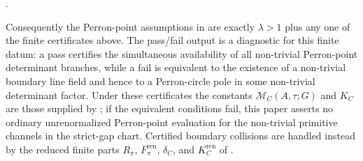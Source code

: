 \begin{proposition}
\begin{enumerate}[label=\rm(\roman*)]
    .
  \end{enumerate}
  Consequently the Perron-point assumptions in
   are
  exactly \(\lambda>1\) plus any one of the finite certificates above.
  The pass/fail output is a diagnostic for this finite datum: a pass certifies the simultaneous
  availability of all non-trivial Perron-point determinant branches, while a
  fail is equivalent to the existence of a non-trivial boundary line field and
  hence to a Perron-circle pole in some non-trivial determinant factor.
  Under these certificates the constants
  \(\mathcal M_C(A,\tau;G)\) and \(K_C\) are those supplied by
  ; if the
  equivalent conditions fail, this paper asserts no ordinary unrenormalized
  Perron-point evaluation for the non-trivial primitive channels in the
  strict-gap chart.  Certified boundary collisions are handled instead by the
  reduced finite parts \(R_\pi\), \(F_\pi^{\mathrm{ren}}\), \(\delta_C\), and
  \(K_C^{\mathrm{ren}}\) of
  .
\end{proposition}

